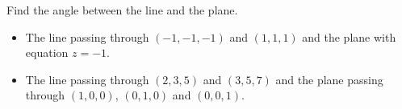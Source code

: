 Find the angle between the line and the plane.

\begin{itemize}
\item The line passing through $(-1,-1,-1) $ and $(1 , 1, 1)$ and the plane with equation $z=-1$.
\item The line passing through $(2,3, 5)$ and $(3,5,7)$ and the plane passing through $(1,0,0)$, $(0,1,0)$ and $(0,0,1)$.
\end{itemize}